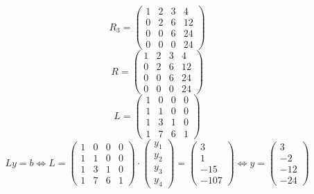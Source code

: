 \documentclass[10pt,a4paper]{article}
\begin{document}
\begin{equation}
  R_{3} = \begin{pmatrix}
    1 & 2 & 3 & 4\\
    0 & 2 & 6 & 12\\
    0 & 0 & 6 & 24\\
    0 & 0 & 0 & 24
  \end{pmatrix}
\end{equation}
\begin{equation}
  R = \begin{pmatrix}
    1 & 2 & 3 & 4\\
    0 & 2 & 6 & 12\\
    0 & 0 & 6 & 24\\
    0 & 0 & 0 & 24
  \end{pmatrix}
\end{equation}
\begin{equation}
  L = \begin{pmatrix}
    1 & 0 & 0 & 0\\
    1 & 1 & 0 & 0\\
    1 & 3 & 1 & 0\\
    1 & 7 & 6 & 1
  \end{pmatrix}
\end{equation}
\begin{equation}
  Ly = b
  \Leftrightarrow
  L = \begin{pmatrix}
    1 & 0 & 0 & 0\\
    1 & 1 & 0 & 0\\
    1 & 3 & 1 & 0\\
    1 & 7 & 6 & 1
  \end{pmatrix}
  \cdot
  \begin{pmatrix}
    y_{1}\\y_{2}\\y_{3}\\y_{4}
  \end{pmatrix}
  =
  \begin{pmatrix}
    3\\1\\-15\\-107
  \end{pmatrix}
  \Leftrightarrow
  y = \begin{pmatrix}
    3\\-2\\-12\\-24
  \end{pmatrix}
\end{equation}
\end{document}
